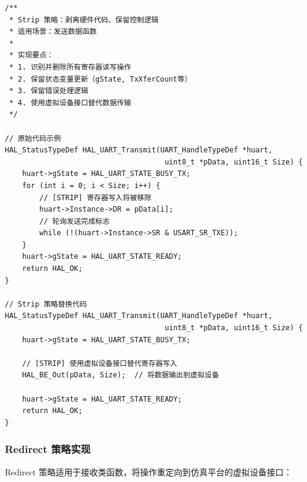 \begin{lstlisting}[style=CStyle,abovecaptionskip=0pt,belowcaptionskip=0pt]
/**
 * Strip 策略：剥离硬件代码、保留控制逻辑
 * 适用场景：发送数据函数
 *
 * 实现要点：
 * 1. 识别并删除所有寄存器读写操作
 * 2. 保留状态变量更新（gState, TxXferCount等）
 * 3. 保留错误处理逻辑
 * 4. 使用虚拟设备接口替代数据传输
 */

// 原始代码示例
HAL_StatusTypeDef HAL_UART_Transmit(UART_HandleTypeDef *huart,
                                     uint8_t *pData, uint16_t Size) {
    huart->gState = HAL_UART_STATE_BUSY_TX;
    for (int i = 0; i < Size; i++) {
        // [STRIP] 寄存器写入将被移除
        huart->Instance->DR = pData[i];
        // 轮询发送完成标志
        while (!(huart->Instance->SR & USART_SR_TXE));
    }
    huart->gState = HAL_UART_STATE_READY;
    return HAL_OK;
}

// Strip 策略替换代码
HAL_StatusTypeDef HAL_UART_Transmit(UART_HandleTypeDef *huart,
                                     uint8_t *pData, uint16_t Size) {
    huart->gState = HAL_UART_STATE_BUSY_TX;
    
    // [STRIP] 使用虚拟设备接口替代寄存器写入
    HAL_BE_Out(pData, Size);  // 将数据输出到虚拟设备
    
    huart->gState = HAL_UART_STATE_READY;
    return HAL_OK;
}
\end{lstlisting}

\subsubsection{Redirect 策略实现}

Redirect 策略适用于接收类函数，将操作重定向到仿真平台的虚拟设备接口：

